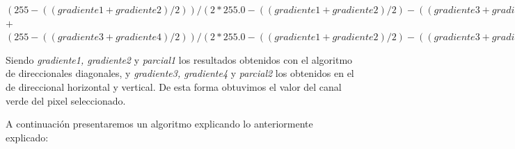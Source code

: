 \documentclass[10pt, a4paper]{article}
\begin{document}
\begin{center}
$(255-((gradiente1 + gradiente2)/2))/(2*255.0-((gradiente1 + gradiente2)/2)-((gradiente3 + gradiente4)/2))*parcial1$\\
$+$\\
$(255-((gradiente3 + gradiente4)/2))/(2*255.0-((gradiente1 + gradiente2)/2)-((gradiente3 + gradiente4)/2))*parcial2;$
\end{center}

Siendo \textit{gradiente1, gradiente2} y \textit{parcial1} los resultados obtenidos con el algoritmo de direccionales diagonales, y \textit{gradiente3, gradiente4} y \textit{parcial2} los obtenidos en el de direccional horizontal y vertical. De esta forma obtuvimos el valor del canal verde del pixel seleccionado. 

A continuaci\'on presentaremos un algoritmo explicando lo anteriormente explicado:
\end{document}
